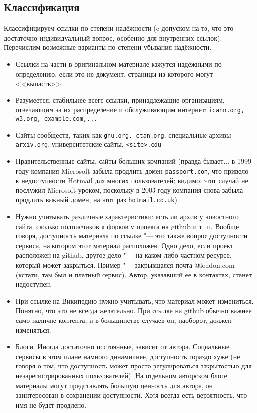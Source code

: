 \documentclass[10pt, a5paper]{article}
\begin{document}
\subsection*{Классификация}

Классифицируем  ссылки  по  степени
надёжности (c  допуском  на  то,  что  это  достаточно  
индивидуальный  вопрос, особенно для внутренних ссылок).
Перечислим возможные варианты по степени убывания надёжности.
\begin{itemize}
\item Ссылки на части в оригинальном материале кажутся надёжными по 
определению, если это не документ, страницы из которого могут <<выпасть>>.  
\item Разумеется, стабильнее всего ссылки,  принадлежащие  организациям,
отвечающим за их распределение и обслуживающим интернет:  
\texttt{icann.org,  w3.org,  example.com,...}
\item Сайты сообществ, таких как \texttt{gnu.org,  ctan.org}, специальные
архивы \texttt{arxiv.org}, университетские сайты, \texttt{<site>.edu}
\item Правительственные  сайты,   сайты   больших   компаний   (правда
бывает... в 1999  году  компания  Microsoft  забыла  продлить  домен
\texttt{passport.com},  что  привело  к  недоступности  Hotmail  для   многих
пользователей; видимо, этот случай  не  послужил  Microsoft  уроком,
поскольку в 2003 году компания снова забыла продлить  важный  домен,
на этот раз \texttt{hotmail.co.uk}\cite{AY1}).
\item Нужно  учитывать  различные  характеристики:  есть  ли  архив   у
новостного сайта, сколько подписчиков и форков у проекта  на  github
и т.~п.
    Вообще говоря, доступность  материала  по  ссылке "---  это  также
вопрос доступности сервиса, на  котором  этот  материал  расположен.
Одно дело, если проект расположен на github, другое дело "--- на  каком-либо
частном ресурсе,  который  может  закрыться.  Пример  "---  закрывшаяся
почта  @london.com  (кстати,  там  был  и  платный  сервис).  Автор,
указавший ее в контактах, станет недоступен.
\item При ссылке  на  Википедию  нужно  учитывать,  что  материал  может
измениться. Понятно, что это не всегда  желательно.  При  ссылке  на
github обычно важнее  само  наличие  контента,  и в  большинстве
случаев он, наоборот, должен изменяться.
\item Блоги.  Иногда  достаточно   постоянные,   зависит   от   автора.
Социальные сервисы в  этом  плане  намного динамичнее,  доступность
гораздо  хуже  (не  говоря  о  том,  что  доступность  может  просто
регулироваться закрытостью для незарегистрированных  пользователей).
На отдельном авторском блоге материалы  могут  представлять  большую
ценность для автора,  он  заинтересован  в  сохранении  доступности.
Хотя всегда есть вероятность, что имя не будет продлено.
\end{itemize}
\end{document}
